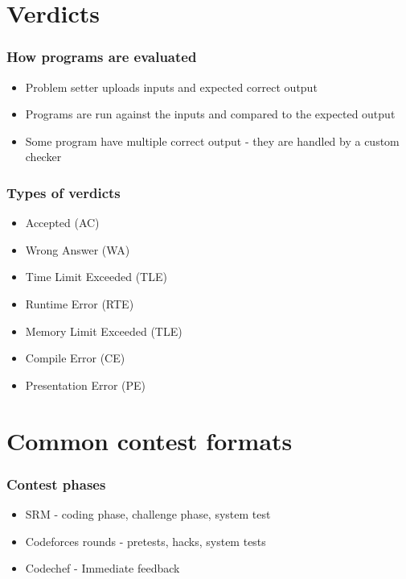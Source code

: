\section{Verdicts}
\begin{frame}
    \frametitle{How programs are evaluated}
    \begin{itemize}
        \item Problem setter uploads inputs and expected correct output \\ \pause
        \item Programs are run against the inputs and compared to the expected output \\ \pause
        \item Some program have multiple correct output - they are handled by a custom checker \\
    \end{itemize}
\end{frame}

\begin{frame}
    \frametitle{Types of verdicts}
    \begin{itemize}
        \item Accepted (AC) \\ \pause
        \item Wrong Answer (WA) \\ \pause
        \item Time Limit Exceeded (TLE) \\ \pause
        \item Runtime Error (RTE) \\ \pause
        \item Memory Limit Exceeded (TLE) \\ \pause
        \item Compile Error (CE) \\ \pause
        \item Presentation Error (PE) \\ 
    \end{itemize}
\end{frame}

\section{Common contest formats}
\begin{frame}
    \frametitle{Contest phases}
    \begin{itemize}
        \item SRM - coding phase, challenge phase, system test \\ \pause
        \item Codeforces rounds - pretests, hacks, system tests \\ \pause
        \item Codechef - Immediate feedback \\
    \end{itemize}
\end{frame}

